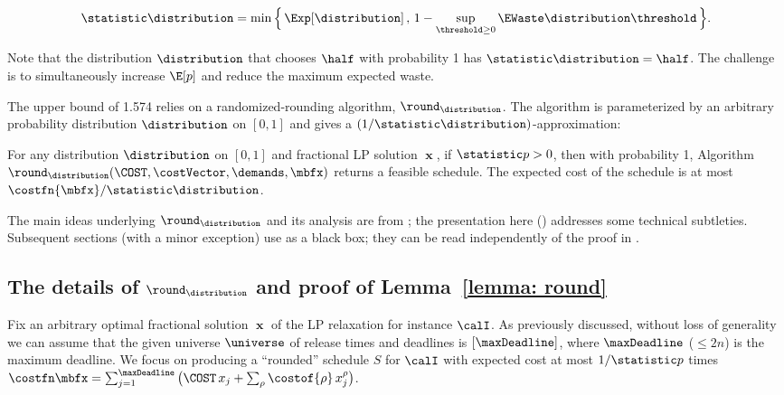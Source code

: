 \begin{equation*}
\statistic \distribution = \min\Big\{\, \Exp[\distribution]\,,\, 
		1-\sup_{\threshold \ge 0} \EWaste \distribution \threshold \,\Big\}.
\end{equation*}

Note that the distribution $\distribution$ that chooses $\half$ with probability 1 has 
$\statistic \distribution = \half$.
The challenge is to simultaneously increase $\E[p]$ and reduce the maximum expected waste.



The upper bound of 1.574 relies on a randomized-rounding algorithm, $\round_\distribution$.
The algorithm is parameterized by an arbitrary probability distribution $\distribution$ on $[0,1]$
and gives a $(1/\statistic \distribution)$-approximation:

\begin{lemma}\label{lemma: round}
For any distribution $\distribution$ on $[0,1]$ and fractional LP solution $\mbfx$,
if $\statistic p > 0$,
then with probability 1, Algorithm~$\round_\distribution(\COST,\costVector,\demands,\mbfx)$ 
returns a feasible schedule.
The expected cost of the schedule is at most $\costfn{\mbfx}/\statistic \distribution$.
\end{lemma}

The main ideas underlying $\round_\distribution$ and its analysis are from \cite{jrp-deadlines-nonner};
the presentation here () addresses some technical subtleties.
Subsequent sections (with a minor exception) use  as a black box;
they can be read independently of the proof in .



\subsection{The details of \texorpdfstring{$\round_\distribution$}{Round(p)} and 
proof of \texorpdfstring{Lemma~\ref{lemma: round}}{Lemma 1}}\label{sec: details}

Fix an arbitrary optimal fractional solution $\mbfx$ of the LP relaxation for instance $\calI$.
As previously discussed, without loss of generality we can assume that
the given universe $\universe$ of release times and deadlines is $[\maxDeadline]$,
where $\maxDeadline$ ($\le 2n$) is the maximum deadline.
We focus on producing a ``rounded'' schedule $S$ for $\calI$
with expected cost at most $1/\statistic p$ times
$\costfn \mbfx = \sum_{j=1}^\maxDeadline \big(\COST\, x_j + \sum_\rho \costof{\rho}\, x_j^\rho\big)$.


